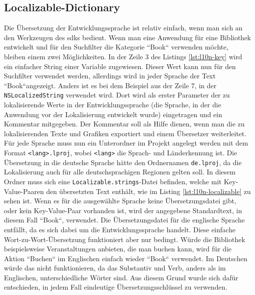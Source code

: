 \subsection{Localizable-Dictionary}
Die Übersetzung der Entwicklungssprache ist relativ einfach, wenn man sich an den Werkzeugen des \Glspl{sdk} bedient.
Wenn man eine Anwendung für eine Bibliothek entwickelt und für den Suchfilter die Kategorie ``Book`` verwenden möchte, bleiben einem zwei Möglichkeiten.
In der Zeile 3 des Listings \ref{lst:l10n-key} wird ein einfacher String einer Variable zugewiesen.
Dieser Wert kann nun für den Suchfilter verwendet werden, allerdings wird in jeder Sprache der Text ``Book``angezeigt.
Anders ist es bei dem Beispiel aus der Zeile 7, in der \texttt{NSLocalizedString} verwendet wird.
Dort wird als erster Parameter der zu lokalisierende Werte in der Entwicklungssprache (die Sprache, in der die Anwendung vor der Lokalisierung entwickelt wurde) eingetragen und ein Kommentar mitgegeben.
Der Kommentar soll als Hilfe dienen, wenn man die zu lokalisierenden Texte und Grafiken exportiert und einem Übersetzer weiterleitet.\pbreak%
%
Für jede Sprache muss nun ein Unterordner im Projekt angelegt werden mit dem Format \texttt{<lang>.lproj}, wobei \texttt{<lang>} die Sprach- und Länderkennung ist.
Die Übersetzung in die deutsche Sprache hätte den Ordnernamen \texttt{de.lproj}, da die Lokalisierung auch für alle deutschsprachigen Regionen gelten soll.
In diesem Ordner muss sich eine \texttt{Localizable.strings}-Datei befinden, welche mit Key-Value-Paaren den übersetzten Text enthält, wie im Listing \ref{lst:l10n-localizable} zu sehen ist.
Wenn es für die ausgewählte Sprache keine Übersetzungsdatei gibt, oder kein Key-Value-Paar vorhanden ist, wird der angegebene Standardtext, in diesem Fall ``Book``, verwendet. Die Übersetzungsdatei für die englische Sprache entfällt, da es sich dabei um die Entwicklungssprache handelt.\pbreak%
%
Diese einfache Wort-zu-Wort-Übersetzung funktioniert aber nur bedingt.
Würde die Bibliothek beispielsweise Veranstaltungen anbieten, die man buchen kann, wird für die Aktion ``Buchen`` im Englischen einfach wieder ``Book`` verwendet.
Im Deutschen würde das nicht funktionieren, da das Substantiv und Verb, anders als im Englischen, unterschiedliche Wörter sind.
Aus diesem Grund wurde sich dafür entschieden, in jedem Fall eindeutige Übersetzungsschlüssel zu verwenden.
